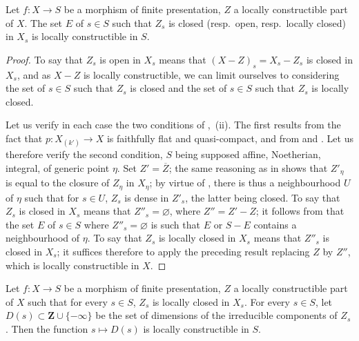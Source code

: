 \begin{corollary}[9.5.4]
\label{IV.9.5.4}
Let $f:X\to S$ be a morphism of finite presentation, $Z$ a locally constructible part of $X$.
The set $E$ of $s\in S$ such that $Z_s$ is closed (resp.\ open, resp.\ locally closed) in $X_s$ is locally constructible in $S$.
\end{corollary}

\begin{proof}
To say that $Z_s$ is open in $X_s$ means that $(X-Z)_s=X_s-Z_s$ is closed in $X_s$, and as $X-Z$ is locally constructible, we can limit ourselves to considering the set of $s\in S$ such that $Z_s$ is closed and the set of $s\in S$ such that $Z_s$ is locally closed.

Let us verify in each case the two conditions of ,~(ii).
The first results from the fact that $p:X_{(k')}\to X$ is faithfully flat and quasi-compact, and from  and .
Let us therefore verify the second condition, $S$ being supposed affine, Noetherian, integral, of generic point $\eta$.
Set $Z'=\overline{Z}$; the same reasoning as in  shows that $Z'_\eta$ is equal to the closure of $Z_\eta$ in $X_\eta$; by virtue of , there is thus a neighbourhood $U$ of $\eta$ such that for $s\in U$, $Z_s$ is dense in $Z'_s$, the latter being closed.
To say that $Z_s$ is closed in $X_s$ means that $Z''_s=\varnothing$, where $Z''=Z'-Z$; it follows from  that the set $E$ of $s\in S$ where $Z''_s=\varnothing$ is such that $E$ or $S-E$ contains a neighbourhood of $\eta$.
To say that $Z_s$ is locally closed in $X_s$ means that $Z''_s$ is closed in $X_s$; it suffices therefore to apply the preceding result replacing $Z$ by $Z''$, which is locally constructible in $X$.
\end{proof}


\begin{proposition}[9.5.5]
\label{IV.9.5.5}
Let $f:X\to S$ be a morphism of finite presentation, $Z$ a locally constructible part of $X$ such that for every $s\in S$, $Z_s$ is locally closed in $X_s$.
For every $s\in S$, let $D(s)\subset\mathbf{Z}\cup\{-\infty\}$ be the set of dimensions of the irreducible components of $Z_s$.
Then the function $s\mapsto D(s)$ is locally constructible in $S$.
\end{proposition}

